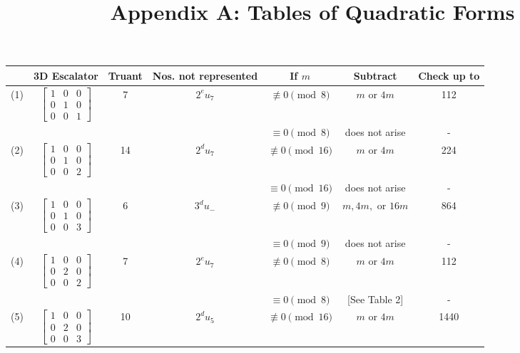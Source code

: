 \documentclass[10pt, letterpaper]{article}
\title{Appendix A: Tables of Quadratic Forms}
\date{}
\author{}
\begin{document}
    
\maketitle

\begin{table}[ht]
    \centering
    \begin{tabular}{|c|c|c|c|c|c|c|}
    \hline
     & 3D Escalator & Truant & Nos. not represented\footnotemark & If $m$ & Subtract & Check up to \\ \hline
    (1) & $\begin{bmatrix} 1 & 0 & 0 \\ 0 & 1 & 0 \\ 0 & 0 & 1 \end{bmatrix}$ & 7 & $2^e u_7$ & $\not\equiv 0 \pmod{8}$ & $m$ or $4m$ & 112 \\
     & & & & $\equiv 0 \pmod{8}$ & does not arise & - \\ \hline
    (2) & $\begin{bmatrix} 1 & 0 & 0 \\ 0 & 1 & 0 \\ 0 & 0 & 2 \end{bmatrix}$ & 14 & $2^d u_7$ & $\not\equiv 0 \pmod{16}$ & $m$ or $4m$ & 224 \\
     & & & & $\equiv 0 \pmod{16}$ & does not arise & - \\ \hline
    (3) & $\begin{bmatrix} 1 & 0 & 0 \\ 0 & 1 & 0 \\ 0 & 0 & 3 \end{bmatrix}$ & 6 & $3^d u_-$ & $\not\equiv 0 \pmod{9}$ & $m, 4m,$ or $16m$ & 864 \\
     & & & & $\equiv 0 \pmod{9}$ & does not arise & - \\ \hline
    (4) & $\begin{bmatrix} 1 & 0 & 0 \\ 0 & 2 & 0 \\ 0 & 0 & 2 \end{bmatrix}$ & 7 & $2^e u_7$ & $\not\equiv 0 \pmod{8}$ & $m$ or $4m$ & 112 \\
     & & & & $\equiv 0 \pmod{8}$ & [See Table 2] & - \\ \hline
    (5) & $\begin{bmatrix} 1 & 0 & 0 \\ 0 & 2 & 0 \\ 0 & 0 & 3 \end{bmatrix}$ & 10 & $2^d u_5$ & $\not\equiv 0 \pmod{16}$ & $m$ or $4m$ & 1440 \\

\end{tabular}
\end{table}
\end{document}
